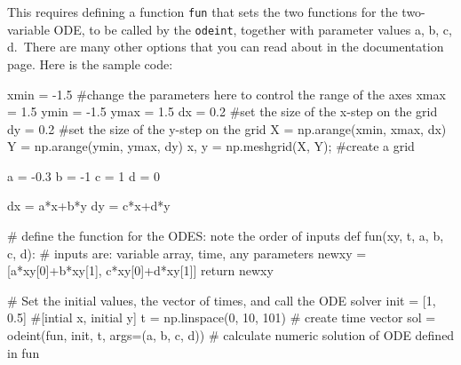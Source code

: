 \documentclass[
  letterpaper,
  DIV=11,
  numbers=noendperiod]{scrreprt}
\newenvironment{Shaded}{\begin{snugshade}}{\end{snugshade}}
\newcommand{\CommentTok}[1]{\textcolor[rgb]{0.37,0.37,0.37}{#1}}
\newcommand{\ControlFlowTok}[1]{\textcolor[rgb]{0.00,0.23,0.31}{#1}}
\newcommand{\DecValTok}[1]{\textcolor[rgb]{0.68,0.00,0.00}{#1}}
\newcommand{\FloatTok}[1]{\textcolor[rgb]{0.68,0.00,0.00}{#1}}
\newcommand{\KeywordTok}[1]{\textcolor[rgb]{0.00,0.23,0.31}{#1}}
\newcommand{\NormalTok}[1]{\textcolor[rgb]{0.00,0.23,0.31}{#1}}
\newcommand{\OperatorTok}[1]{\textcolor[rgb]{0.37,0.37,0.37}{#1}}
\begin{document}
This requires defining a function \texttt{fun} that sets the two
functions for the two-variable ODE, to be called by the \texttt{odeint},
together with parameter values a, b, c, d.~There are many other options
that you can read about in the documentation page. Here is the sample
code:

\begin{Shaded}
\begin{Highlighting}[]
\NormalTok{xmin }\OperatorTok{=} \OperatorTok{{-}}\FloatTok{1.5} \CommentTok{\#change the parameters here to control the range of the axes}
\NormalTok{xmax }\OperatorTok{=} \FloatTok{1.5}
\NormalTok{ymin }\OperatorTok{=} \OperatorTok{{-}}\FloatTok{1.5}
\NormalTok{ymax }\OperatorTok{=} \FloatTok{1.5}
\NormalTok{dx }\OperatorTok{=} \FloatTok{0.2} \CommentTok{\#set the size of the x{-}step on the grid}
\NormalTok{dy }\OperatorTok{=} \FloatTok{0.2} \CommentTok{\#set the size of the y{-}step on the grid}
\NormalTok{X }\OperatorTok{=}\NormalTok{ np.arange(xmin, xmax, dx)}
\NormalTok{Y }\OperatorTok{=}\NormalTok{ np.arange(ymin, ymax, dy)}
\NormalTok{x, y }\OperatorTok{=}\NormalTok{ np.meshgrid(X, Y)}\OperatorTok{;}  \CommentTok{\#create a grid}

\NormalTok{a }\OperatorTok{=} \OperatorTok{{-}}\FloatTok{0.3}
\NormalTok{b }\OperatorTok{=} \OperatorTok{{-}}\DecValTok{1}
\NormalTok{c }\OperatorTok{=} \DecValTok{1}
\NormalTok{d }\OperatorTok{=} \DecValTok{0}

\NormalTok{dx }\OperatorTok{=}\NormalTok{ a}\OperatorTok{*}\NormalTok{x}\OperatorTok{+}\NormalTok{b}\OperatorTok{*}\NormalTok{y}
\NormalTok{dy }\OperatorTok{=}\NormalTok{ c}\OperatorTok{*}\NormalTok{x}\OperatorTok{+}\NormalTok{d}\OperatorTok{*}\NormalTok{y}

\CommentTok{\# define the function for the ODES: note the order of inputs }
\KeywordTok{def}\NormalTok{ fun(xy, t, a, b, c, d):  }\CommentTok{\# inputs are: variable array, time, any parameters}
\NormalTok{    newxy }\OperatorTok{=}\NormalTok{ [a}\OperatorTok{*}\NormalTok{xy[}\DecValTok{0}\NormalTok{]}\OperatorTok{+}\NormalTok{b}\OperatorTok{*}\NormalTok{xy[}\DecValTok{1}\NormalTok{], c}\OperatorTok{*}\NormalTok{xy[}\DecValTok{0}\NormalTok{]}\OperatorTok{+}\NormalTok{d}\OperatorTok{*}\NormalTok{xy[}\DecValTok{1}\NormalTok{]]}
    \ControlFlowTok{return}\NormalTok{ newxy}

\CommentTok{\# Set the initial values, the vector of times, and call the ODE solver}
\NormalTok{init }\OperatorTok{=}\NormalTok{ [}\DecValTok{1}\NormalTok{, }\FloatTok{0.5}\NormalTok{] }\CommentTok{\#[intial x, initial y]}
\NormalTok{t }\OperatorTok{=}\NormalTok{ np.linspace(}\DecValTok{0}\NormalTok{, }\DecValTok{10}\NormalTok{, }\DecValTok{101}\NormalTok{) }\CommentTok{\# create time vector }
\NormalTok{sol }\OperatorTok{=}\NormalTok{ odeint(fun, init, t, args}\OperatorTok{=}\NormalTok{(a, b, c, d)) }\CommentTok{\# calculate numeric solution of ODE defined in fun}


\end{Highlighting}
\end{Shaded}
\end{document}
